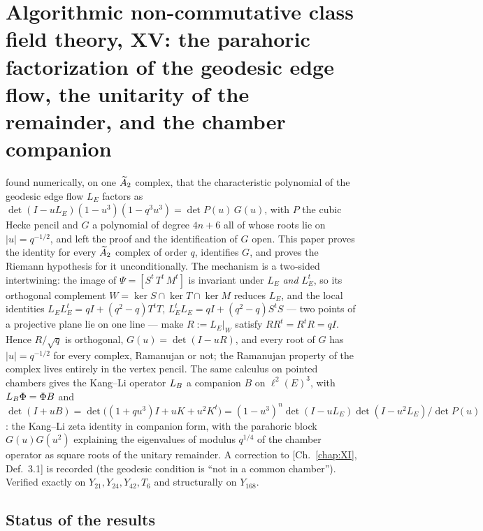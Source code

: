 \renewcommand{\LE}{L_E}
\chapter[XV. The parahoric factorization of the geodesic edge flow, the unitarity of the remainder,
and the chamber companion]{Algorithmic non-commutative class field theory, XV: the parahoric factorization of the geodesic edge flow, the unitarity of the remainder,
and the chamber companion}\label{chap:XV}
\begin{chapterabstract}
 found numerically, on one $\widetilde A_2$ complex, that the characteristic polynomial of
the geodesic edge flow $\LE$ factors as $\det(I-u\LE)(1-u^{3})(1-q^{3}u^{3})=\det P(u)\,G(u)$,
with $P$ the cubic Hecke pencil and $G$ a polynomial of degree $4n+6$ all of whose roots lie
on $|u|=q^{-1/2}$, and left the proof and the identification of $G$ open. This paper proves
the identity for every $\widetilde A_2$ complex of order $q$, identifies $G$, and proves the
Riemann hypothesis for it unconditionally. The mechanism is a two-sided intertwining: the
image of $\Psi=[S^{t}\,T^{t}\,M^{t}]$ is invariant under $\LE$ \emph{and} $\LE^{t}$, so its
orthogonal complement $W=\ker S\cap\ker T\cap\ker M$ reduces $\LE$, and the local identities
$\LE\LE^{t}=qI+(q^{2}-q)T^{t}T$, $\LE^{t}\LE=qI+(q^{2}-q)S^{t}S$ --- two points of a projective
plane lie on one line --- make $R:=\LE|_W$ satisfy $RR^{t}=R^{t}R=qI$. Hence $R/\sqrt q$ is
orthogonal, $G(u)=\det(I-uR)$, and every root of $G$ has $|u|=q^{-1/2}$ for every complex,
Ramanujan or not; the Ramanujan property of the complex lives entirely in the vertex pencil.
The same calculus on pointed chambers gives the Kang--Li operator $L_B$ a companion
$B$ on $\ell^{2}(E)^{3}$, with $L_B\Phi=\Phi B$ and
$\det(I+uB)=\det\bigl((1+qu^{3})I+uK+u^{2}K^{t}\bigr)
=(1-u^{3})^{n}\det(I-u\LE)\det(I-u^{2}\LE)/\det P(u)$: the Kang--Li zeta identity in companion
form, with the parahoric block $G(u)G(u^{2})$ explaining the eigenvalues of modulus
$q^{1/4}$ of the chamber operator as square roots of the unitary remainder. A correction to
[Ch.~\ref{chap:XI}, Def.~3.1] is recorded (the geodesic condition is ``not in a common chamber''). Verified
exactly on $Y_{21},Y_{24},Y_{42},T_6$ and structurally on $Y_{168}$.
\end{chapterabstract}

\section*{Status of the results}

